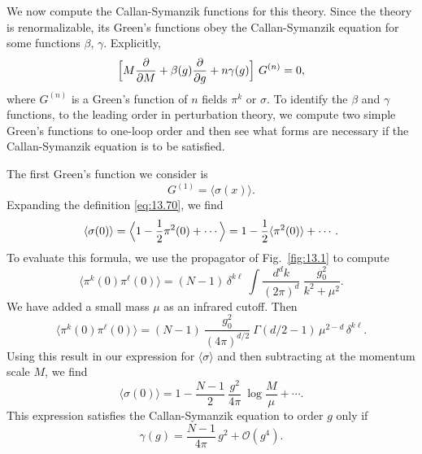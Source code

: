 We now compute the Callan-Symanzik functions for this theory.  Since the
theory is renormalizable, its Green's functions obey the Callan-Symanzik
equation for some functions $\beta$, $\gamma$.  Explicitly,
\begin{equation}
  \Bigl[ M\frac{\partial}{\partial M} + \beta(g)\frac{\partial}{\partial g}
    + n\gamma(g) \Bigr]\ G^{(n)} = 0 ,
  \label{eq:13.74}
\end{equation}
where $G^{(n)}$ is a Green's function of $n$ fields $\pi^k$ or $\sigma$.  To
identify the $\beta$ and $\gamma$ functions, to the leading order in
perturbation theory, we compute two simple Green's functions to one-loop
order and then see what forms are necessary if the Callan-Symanzik equation
is to be satisfied.

The first Green's function we consider is
\begin{equation}
  G^{(1)} = \langle\sigma(x)\rangle .
  \label{eq:13.75}
\end{equation}
Expanding the definition \eqref{eq:13.70}, we find
\begin{equation}
  \langle\sigma(0)\rangle = \Bigl\langle 1 - \frac{1}{2}\pi^2(0) + \cdots
    \Bigr\rangle = 1 - \frac{1}{2}\langle\pi^2(0)\rangle + \cdots .
  \label{eq:13.76}
\end{equation}
To evaluate this formula, we use the propagator of Fig.~\ref{fig:13.1} to
compute
\begin{equation}
  \langle\pi^k(0)\pi^\ell(0)\rangle = (N-1)\,\delta^{k\ell}\ \int
    \frac{d^dk}{(2\pi)^d}\ \frac{g_0^2}{k^2+\mu^2} .
  \label{eq:13.77}
\end{equation}
We have added a small mass $\mu$ as an infrared cutoff.  Then
\begin{equation}
  \langle\pi^k(0)\pi^\ell(0)\rangle = (N-1)\ \frac{g_0^2}{(4\pi)^{d/2}}\
    \Gamma(d/2-1)\,\mu^{2-d}\,\delta^{k\ell} .
  \label{eq:13.78}
\end{equation}
Using this result in our expression for $\langle\sigma\rangle$ and then
subtracting at the momentum scale $M$, we find
\begin{equation}
  \langle\sigma(0)\rangle = 1 - \frac{N-1}{2}\ \frac{g^2}{4\pi}\
    \log\frac{M}{\mu} + \cdots .
  \label{eq:13.79}
\end{equation}
This expression satisfies the Callan-Symanzik equation to order $g$ only if
\begin{equation}
  \gamma(g) = \frac{N-1}{4\pi}\,g^2 + \mathcal{O}(g^4) .
  \label{eq:13.80}
\end{equation}

